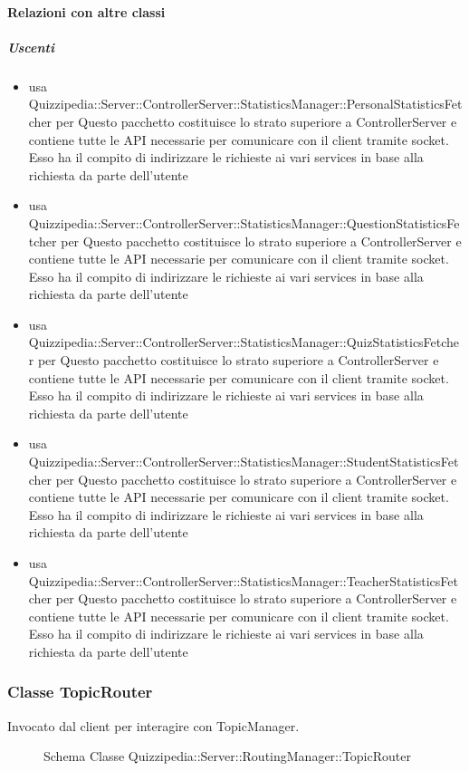 \paragraph{Relazioni con altre classi}
\subparagraph{Uscenti}
\begin{itemize}
\item usa Quizzipedia::Server::ControllerServer::StatisticsManager::PersonalStatisticsFetcher per Questo pacchetto costituisce lo strato superiore a ControllerServer e contiene tutte le API necessarie per comunicare con il client tramite socket. Esso ha il compito di indirizzare le richieste ai vari services in base alla richiesta da parte dell'utente
\item usa Quizzipedia::Server::ControllerServer::StatisticsManager::QuestionStatisticsFetcher per Questo pacchetto costituisce lo strato superiore a ControllerServer e contiene tutte le API necessarie per comunicare con il client tramite socket. Esso ha il compito di indirizzare le richieste ai vari services in base alla richiesta da parte dell'utente
\item usa Quizzipedia::Server::ControllerServer::StatisticsManager::QuizStatisticsFetcher per Questo pacchetto costituisce lo strato superiore a ControllerServer e contiene tutte le API necessarie per comunicare con il client tramite socket. Esso ha il compito di indirizzare le richieste ai vari services in base alla richiesta da parte dell'utente
\item usa Quizzipedia::Server::ControllerServer::StatisticsManager::StudentStatisticsFetcher per Questo pacchetto costituisce lo strato superiore a ControllerServer e contiene tutte le API necessarie per comunicare con il client tramite socket. Esso ha il compito di indirizzare le richieste ai vari services in base alla richiesta da parte dell'utente
\item usa Quizzipedia::Server::ControllerServer::StatisticsManager::TeacherStatisticsFetcher per Questo pacchetto costituisce lo strato superiore a ControllerServer e contiene tutte le API necessarie per comunicare con il client tramite socket. Esso ha il compito di indirizzare le richieste ai vari services in base alla richiesta da parte dell'utente
\end{itemize}
\subsubsection{Classe TopicRouter}
Invocato dal client per interagire con TopicManager.
\begin{figure}[H]
\centering
\noindent{}
\caption[Schema Classe TopicRouter]{Schema Classe Quizzipedia::Server::RoutingManager::TopicRouter}
\end{figure}
